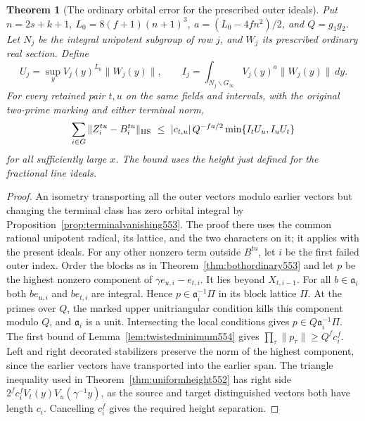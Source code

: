 \documentclass[a4paper,11pt]{article}
\newtheorem{theorem}[proposition]{Theorem}
\theoremstyle{definition}
\theoremstyle{remark}
\numberwithin{equation}{section}
\begin{document}
\begin{theorem}[The ordinary orbital error for the prescribed outer ideals]
\leavevmode\label{thm:idealordinary554}
Put \(n=2s+k+1,\ L_0=8(f+1)(n+1)^3,\ a=(L_0-4fn^2)/2\), and
\(Q=g_1g_2\). Let \(N_j\) be the integral unipotent subgroup of
row \(j\), and \(W_j\) its prescribed ordinary real section. Define
\[
 U_j=\sup_y V_j(y)^{L_0}\|W_j(y)\|,\qquad
 I_j=\int_{N_j\backslash G_\infty}V_j(y)^a\|W_j(y)\|\,dy .
\]
For every retained pair \(t,u\) on the same fields and intervals,
with the original two-prime marking and either terminal norm,
\[
 \sum_{i\in G}\|Z_i^{tu}-B_i^{tu}\|_{\rm HS}
 \ \le\ |c_{t,u}|\, Q^{-fa/2}\min\{ I_t U_u,I_u U_t\}
\]
for all sufficiently large \(x\). The bound uses the height
just defined for the fractional line ideals.
\end{theorem}
\begin{proof}
An isometry transporting all the outer vectors modulo earlier
vectors but changing the terminal class has zero orbital
integral by Proposition~\ref{prop:terminalvanishing553}.
The proof there uses the common rational unipotent radical,
its lattice, and the two characters on it; it applies with
the present ideals. For any other nonzero term outside
\(B^{tu}\), let \(i\) be the first failed outer index. Order
the blocks as in Theorem~\ref{thm:bothordinary553} and let \(p\)
be the highest nonzero component of \(\gamma e_{u,i}-e_{t,i}\).
It lies beyond \(X_{t,i-1}\). For all \(b\in\mathfrak a_i\)
both \(b e_{u,i}\) and \(b e_{t,i}\) are integral. Hence
\(p\in\mathfrak a_i^{-1}\Pi\) in its block lattice \(\Pi\).
At the primes over \(Q\), the marked upper unitriangular
condition kills this component modulo \(Q\), and
\(\mathfrak a_i\) is a unit. Intersecting the local
conditions gives \(p\in Q\mathfrak a_i^{-1}\Pi\).
The first bound of Lemma~\ref{lem:twistedminimum554} gives
\(\prod_\tau\|p_\tau\|\ge Q^f c_i^f\). Left and right decorated
stabilizers preserve the norm of the highest component, since
the earlier vectors have transported into the earlier span.
The triangle inequality used in Theorem~\ref{thm:uniformheight552}
has right side \(2^f c_i^f V_t(y)V_u(\gamma^{-1}y)\), as the
source and target distinguished vectors both have length \(c_i\).
Cancelling \(c_i^f\) gives the required height separation.


\end{proof}
\end{document}
